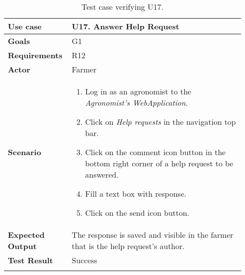 \begin{longtable}{@{}p{0.25\linewidth}p{0.71\linewidth}@{}}
	\toprule
	\textbf{Use case} & \textbf{U17.} Answer Help Request \\
	\midrule
	\textbf{Goals} & G1\\
	\midrule
	\textbf{Requirements} & R12\\
	\midrule
	\textbf{Actor} & Farmer\\
	\midrule
	\textbf{Scenario} & \begin{enumerate}[leftmargin=.4cm,noitemsep,topsep=0pt,before=\vspace{-3mm},after=\vspace{-4mm}]
		\item Log in as an agronomist to the \textit{Agronomist's WebApplication}.
		\item Click on \textit{Help requests} in the navigation top bar.
		\item Click on the comment icon button in the bottom right corner of a help request to be answered.
		\item Fill a text box with response.
		\item Click on the send icon button.
	\end{enumerate}\\
	\midrule
	\textbf{Expected Output} & The response is saved and visible in the farmer that is the help request's author.\\
	\midrule
	\textbf{Test Result} & Success\\
	\bottomrule
	\caption{Test case verifying U17.}
\end{longtable}